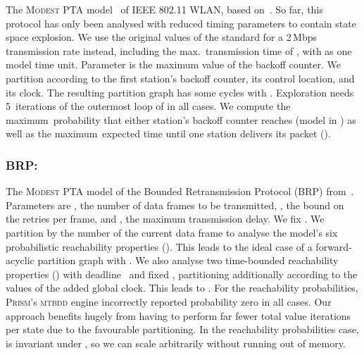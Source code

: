 \documentclass{llncs}
\newcommand{\modest}{\textsc{\mbox{Modest}}\xspace}
\newcommand{\prism}{\textsc{Prism}\xspace}
\begin{document}
The \modest PTA model~\cite{HH09} of IEEE 802.11 WLAN, based on~\cite{KNS02}.
So far, this protocol has only been analysed with reduced timing parameters to contain state space explosion.
We use the original values of the standard for a 2\,Mbps transmission rate instead, including the max.\ transmission time of \upmu{}, with \upmu{} as one model time unit.
Parameter  is the maximum value of the backoff counter.
We partition according to the first station's backoff counter, its control location, and its clock.
The resulting partition graph has some cycles with .
Exploration needs 5~iterations of the outermost loop of  in all cases.
We compute the maximum\ probability that either station's backoff counter reaches  (model  in ) as well as the maximum\ expected time until one station delivers its packet ().
\iffalse
Under heading ``full matrix'', we report the disk space that would be needed for the sparse matrix-like representation of the entire state space in the random access format of \Cref{fig:SparseMatrixMemory} (``RA'') or in inverse-sequential format (``IS''), and the actual disk usage of the latter combined with compression (``'').
We see that the inverse-sequential format reduces disk usage by  and compression adds another  reduction.
In the end, disk usage is reduced by a factor of around~10.
We observed a similar behaviour on the other models.
\fi


\subsubsection{BRP:}

The \modest PTA model of the Bounded Retransmission Protocol (BRP) from~\cite{HH09}.
Parameters are , the number of data frames to be transmitted, , the bound on the retries per frame, and , the maximum transmission delay.
We fix .
We partition by the number of the current data frame to analyse the model's six probabilistic reachability properties ().
This leads to the ideal case of a forward-acyclic partition graph with .
We also analyse two time-bounded reachability properties () with deadline~ and fixed , partitioning additionally according to the values of the added global clock.
This leads to .
For the reachability probabilities, \prism's \textsc{mtbdd} engine incorrectly reported probability zero in all cases.
Our approach benefits hugely from having to perform far fewer total value iterations per state due to the favourable partitioning.
In the reachability probabilities case,  is invariant under , so we can scale  arbitrarily without running out of memory.
\end{document}
